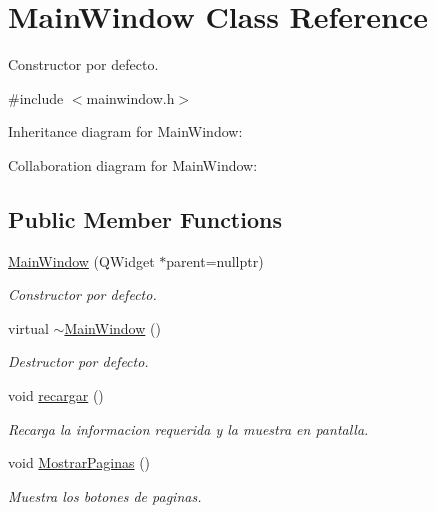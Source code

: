 \hypertarget{classMainWindow}{}\section{Main\+Window Class Reference}
\label{classMainWindow}


Constructor por defecto.  




{\ttfamily \#include $<$mainwindow.\+h$>$}



Inheritance diagram for Main\+Window\+:


Collaboration diagram for Main\+Window\+:
\subsection*{Public Member Functions}
\begin{DoxyCompactItemize}
\item 
\hyperlink{classMainWindow_a996c5a2b6f77944776856f08ec30858d}{Main\+Window} (Q\+Widget $\ast$parent=nullptr)
\begin{DoxyCompactList}\small\item\em Constructor por defecto. \end{DoxyCompactList}\item 
\mbox{\label{classMainWindow_ae98d00a93bc118200eeef9f9bba1dba7}} 
virtual \hyperlink{classMainWindow_ae98d00a93bc118200eeef9f9bba1dba7}{$\sim$\+Main\+Window} ()
\begin{DoxyCompactList}\small\item\em Destructor por defecto. \end{DoxyCompactList}\item 
\mbox{\label{classMainWindow_ac6dc0cf2caaa177344b98d0fec5512fc}} 
void \hyperlink{classMainWindow_ac6dc0cf2caaa177344b98d0fec5512fc}{recargar} ()
\begin{DoxyCompactList}\small\item\em Recarga la informacion requerida y la muestra en pantalla. \end{DoxyCompactList}\item 
void \hyperlink{classMainWindow_a3b74d34ab10f6d5b766d2bf48ceb36cc}{Mostrar\+Paginas} ()
\begin{DoxyCompactList}\small\item\em Muestra los botones de paginas. \end{DoxyCompactList}\end{DoxyCompactItemize}
